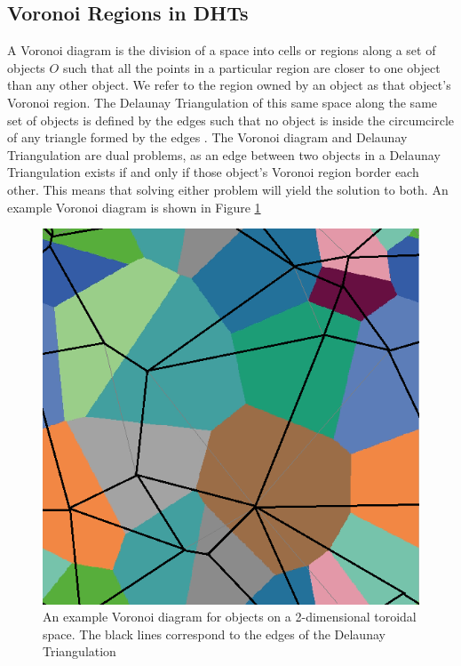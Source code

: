 \documentclass{IEEEtran}
\begin{document}
\subsection{Voronoi Regions in DHTs}
A Voronoi diagram is the division of a space into cells or regions along a set of objects $O$ such that all the points in a particular region are closer to one object than any other object.  
We refer to the region owned by an object as that object's Voronoi region.
The Delaunay Triangulation of this same space along the same set of objects is defined by the edges such that no object is inside the circumcircle of any triangle formed by the edges \cite{geoalg}.  
The Voronoi diagram and Delaunay Triangulation are dual problems, as an edge between two objects in a Delaunay Triangulation exists if and only if those object's Voronoi region border each other.  
This means that solving either problem will yield the solution to both.   An example Voronoi diagram is shown in Figure \ref{voro-ex}


\begin{figure}
	\includegraphics[width=\linewidth]{voronoi-example}
	\caption{An example Voronoi diagram for objects on a 2-dimensional toroidal space.  The black lines correspond to the edges of the Delaunay Triangulation}
	\label{voro-ex}
\end{figure}
\end{document}
